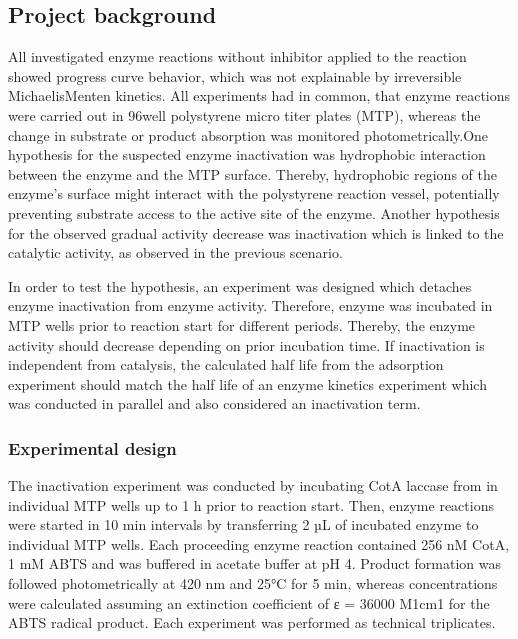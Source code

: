 \documentclass[letterpaper,12pt,english]{jupyterBook}
\begin{document}
\subsection{Project background}
\label{\detokenize{scenarios/enzyme_inactivation:project-background}}
\sphinxAtStartPar
All investigated enzyme reactions without inhibitor applied to the reaction showed progress curve behavior, which was not explainable by irreversible Michaelis\sphinxhyphen{}Menten kinetics. All experiments had in common, that enzyme reactions were carried out in 96\sphinxhyphen{}well polystyrene micro titer plates (MTP), whereas the change in substrate or product absorption was monitored photometrically.One hypothesis for the suspected enzyme inactivation was hydrophobic interaction between the enzyme and the MTP surface. Thereby, hydrophobic regions of the enzyme’s surface might interact with the polystyrene reaction vessel, potentially preventing substrate access to the active site of the enzyme. Another hypothesis for the observed gradual activity decrease was inactivation which is linked to the catalytic activity, as observed in the previous scenario.

\sphinxAtStartPar
In order to test the hypothesis, an experiment was designed which detaches enzyme inactivation from enzyme activity. Therefore, enzyme was incubated in MTP wells prior to reaction start for different periods. Thereby, the enzyme activity should decrease depending on prior incubation time. If inactivation is independent from catalysis, the calculated half life from the adsorption experiment should match the half life of an enzyme kinetics experiment which was conducted in parallel and also considered an inactivation term.


\subsubsection{Experimental design}
\label{\detokenize{scenarios/enzyme_inactivation:experimental-design}}
\sphinxAtStartPar
{}

The inactivation experiment was conducted by incubating CotA laccase from  in individual MTP wells up to 1 h prior to reaction start. Then, enzyme reactions were started in 10 min intervals by transferring 2 µL of incubated enzyme to individual MTP wells. Each proceeding enzyme reaction contained 256 nM CotA, 1 mM ABTS and was buffered in acetate buffer at pH 4. Product formation was followed photometrically at 420 nm and 25°C for 5 min, whereas concentrations were calculated assuming an extinction coefficient of ε = 36000 M\sphinxhyphen{}1cm\sphinxhyphen{}1 for the ABTS radical product. Each experiment was performed as technical triplicates.
\end{document}
